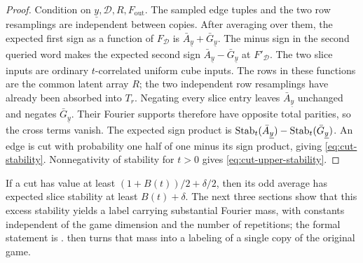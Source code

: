 \begin{proof}
Condition on $\underline y,\mathcal D,R,F_{\mathrm{out}}$.
The sampled edge tuples and the two row resamplings are independent
between copies. After averaging over them, the expected first sign as a
function of $F_{\mathcal D}$ is $\bar A_{\underline y}+\bar G_{\underline y}$.
The minus sign in the second queried word makes the expected second sign
$\bar A_{\underline y}-\bar G_{\underline y}$ at $F'_{\mathcal D}$.
The two slice inputs are ordinary $t$-correlated uniform cube inputs.
The rows in these functions are the common latent array $R$; the two
independent row resamplings have already been absorbed into $T_r$.
Negating every slice entry leaves $\bar A_{\underline y}$ unchanged and
negates $\bar G_{\underline y}$. Their Fourier supports therefore have
opposite total parities, so the cross terms vanish. The expected sign
product is
$\operatorname{Stab}_t(\bar A_{\underline y})-\operatorname{Stab}_t(\bar G_{\underline y})$.
An edge is cut with probability one half of one minus its sign product,
giving \eqref{eq:cut-stability}. Nonnegativity of stability for $t>0$
gives \eqref{eq:cut-upper-stability}.
\end{proof}

If a cut has value at least $(1+B(t))/2+\delta/2$, then its odd average
has expected slice stability at least $B(t)+\delta$.
The next three sections show that this excess stability yields a label
carrying substantial Fourier mass, with constants independent of the game
dimension and the number of repetitions; the formal statement is
.  then turns that mass into a
labeling of a single copy of the original game.
